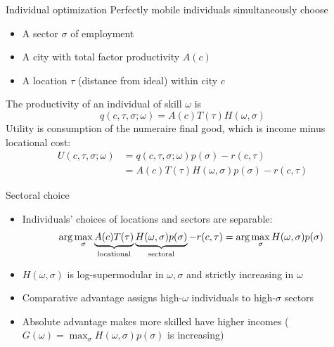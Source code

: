 \documentclass[11pt,notes=hide,aspectratio=169]{beamer}
\begin{document}
\begin{frame}{Individual optimization}
Perfectly mobile individuals simultaneously choose
\begin{itemize}
\item A sector $\sigma$ of employment
\item A city with total factor productivity $A(c)$
\item A location $\tau$ (distance from ideal) within city $c$
\end{itemize}
The productivity of an individual of skill $\omega$ is
\[
q(c,\tau,\sigma;\omega)=A(c)T(\tau)H(\omega,\sigma)
\]
Utility is consumption of the numeraire final good, which is income minus locational cost:
\begin{align*}
U(c,\tau,\sigma;\omega) & =q(c,\tau,\sigma;\omega)p(\sigma)-r(c,\tau)\\
 & =A(c)T(\tau)H(\omega,\sigma)p(\sigma)-r(c,\tau)
\end{align*}
\end{frame}
\begin{frame}{Sectoral choice}
\begin{itemize}
\item Individuals' choices of locations and sectors are separable: 
\begin{align*}
\arg\max_{\sigma}\underbrace{A(c)T(\tau)}_{\textnormal{locational}}\underbrace{H(\omega,\sigma)p(\sigma)}_{\textnormal{sectoral}}-r(c,\tau)=\arg\max_{\sigma}H(\omega,\sigma)p(\sigma)
\end{align*}
\item $H(\omega,\sigma)$ is log-supermodular in $\omega,\sigma$ and strictly increasing in $\omega$
\item Comparative advantage assigns high-$\omega$ individuals to high-$\sigma$ sectors
\item Absolute advantage makes more skilled have higher incomes ($G(\omega)=\max_{\sigma}H(\omega,\sigma)p(\sigma)$
is increasing)
\end{itemize}
\end{frame}
\end{document}
